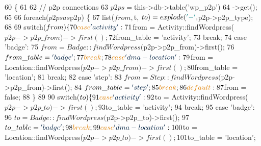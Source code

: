 \begin{DoxyCode}
60     \{  
61 
62         \textcolor{comment}{// p2p connections}
63         $p2ps = $this->db->table(\textcolor{stringliteral}{'wp\_p2p'})
64             ->get();
65 
66         \textcolor{keywordflow}{foreach}($p2ps as $p2p) \{
67             list($from, $t, $to) = explode(\textcolor{charliteral}{'-'}, $p2p->p2p\_type);
68 
69             \textcolor{keywordflow}{switch}($from) \{
70                 \textcolor{keywordflow}{case} \textcolor{stringliteral}{'activity'}:
71                     $from = Activity::findWordpress($p2p->p2p\_from)->first();
72                     $from\_table = \textcolor{stringliteral}{'activity'};
73                     \textcolor{keywordflow}{break};
74                 \textcolor{keywordflow}{case} \textcolor{stringliteral}{'badge'}:
75                     $from = Badge::findWordpress($p2p->p2p\_from)->first();
76                     $from\_table = \textcolor{stringliteral}{'badge'};
77                     \textcolor{keywordflow}{break};
78                 \textcolor{keywordflow}{case} \textcolor{stringliteral}{'dma-location'}:
79                     $from = Location::findWordpress($p2p->p2p\_from)->first();
80                     $from\_table = \textcolor{stringliteral}{'location'};
81                     \textcolor{keywordflow}{break};
82                 \textcolor{keywordflow}{case} \textcolor{stringliteral}{'step'}:
83                     $from = Step::findWordpress($p2p->p2p\_from)->first();
84                     $from\_table = \textcolor{stringliteral}{'step'};
85                     \textcolor{keywordflow}{break};
86                 \textcolor{keywordflow}{default}:
87                     $from = \textcolor{keyword}{false};
88             \}
89 
90             \textcolor{keywordflow}{switch}($to) \{
91                 \textcolor{keywordflow}{case} \textcolor{stringliteral}{'activity'}:
92                     $to = Activity::findWordpress($p2p->p2p\_to)->first();
93                     $to\_table = \textcolor{stringliteral}{'activity'};
94                     \textcolor{keywordflow}{break};
95                 \textcolor{keywordflow}{case} \textcolor{stringliteral}{'badge'}:
96                     $to = Badge::findWordpress($p2p->p2p\_to)->first();
97                     $to\_table = \textcolor{stringliteral}{'badge'};
98                     \textcolor{keywordflow}{break};
99                 \textcolor{keywordflow}{case} \textcolor{stringliteral}{'dma-location'}:
100                     $to = Location::findWordpress($p2p->p2p\_to)->first();
101                     $to\_table = \textcolor{stringliteral}{'location'};

\end{DoxyCode}
